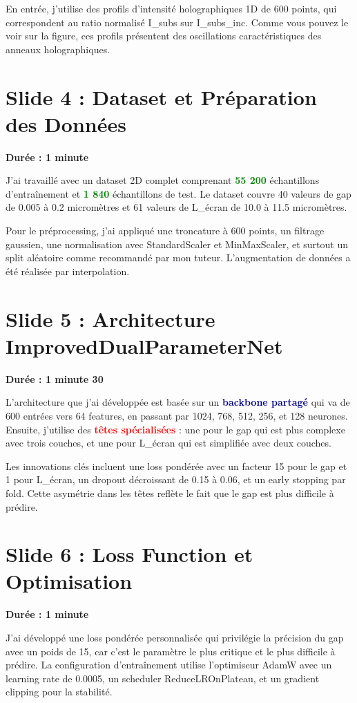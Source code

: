 \documentclass[12pt,a4paper]{article}
\begin{document}
En entrée, j'utilise des profils d'intensité holographiques 1D de 600 points, qui correspondent au ratio normalisé I\_subs sur I\_subs\_inc. Comme vous pouvez le voir sur la figure, ces profils présentent des oscillations caractéristiques des anneaux holographiques.

\section{Slide 4 : Dataset et Préparation des Données}
\textbf{Durée : 1 minute}

J'ai travaillé avec un dataset 2D complet comprenant \textcolor{green}{\textbf{55 200}} échantillons d'entraînement et \textcolor{green}{\textbf{1 840}} échantillons de test. Le dataset couvre 40 valeurs de gap de 0.005 à 0.2 micromètres et 61 valeurs de L\_écran de 10.0 à 11.5 micromètres.

Pour le préprocessing, j'ai appliqué une troncature à 600 points, un filtrage gaussien, une normalisation avec StandardScaler et MinMaxScaler, et surtout un split aléatoire comme recommandé par mon tuteur. L'augmentation de données a été réalisée par interpolation.

\section{Slide 5 : Architecture ImprovedDualParameterNet}
\textbf{Durée : 1 minute 30}

L'architecture que j'ai développée est basée sur un \textcolor{darkblue}{\textbf{backbone partagé}} qui va de 600 entrées vers 64 features, en passant par 1024, 768, 512, 256, et 128 neurones. Ensuite, j'utilise des \textcolor{red}{\textbf{têtes spécialisées}} : une pour le gap qui est plus complexe avec trois couches, et une pour L\_écran qui est simplifiée avec deux couches.

Les innovations clés incluent une loss pondérée avec un facteur 15 pour le gap et 1 pour L\_écran, un dropout décroissant de 0.15 à 0.06, et un early stopping par fold. Cette asymétrie dans les têtes reflète le fait que le gap est plus difficile à prédire.

\section{Slide 6 : Loss Function et Optimisation}
\textbf{Durée : 1 minute}

J'ai développé une loss pondérée personnalisée qui privilégie la précision du gap avec un poids de 15, car c'est le paramètre le plus critique et le plus difficile à prédire. La configuration d'entraînement utilise l'optimiseur AdamW avec un learning rate de 0.0005, un scheduler ReduceLROnPlateau, et un gradient clipping pour la stabilité.
\end{document}
